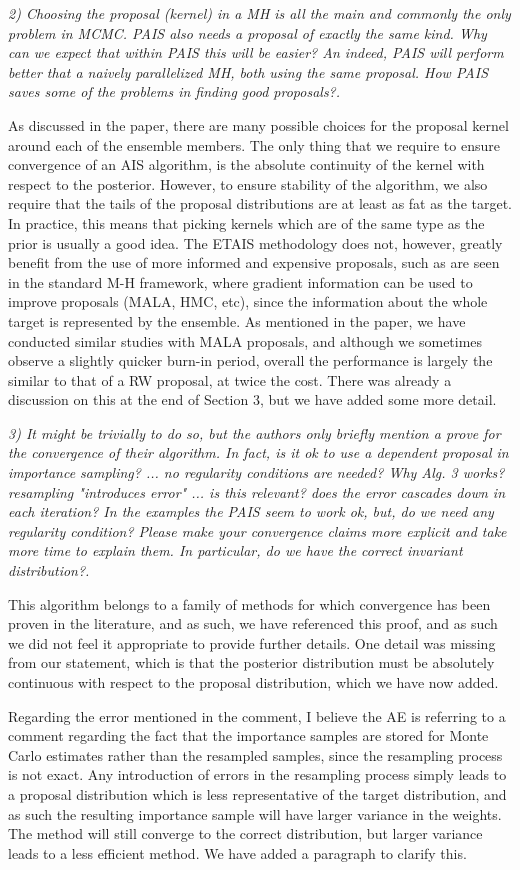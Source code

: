 \documentclass{article}
\newcommand{\comment}[2]{\vspace{0.6cm}{\bf Comment:} {\it #1.}

\vspace{0.3cm}{\bf Answer:} #2}
\begin{document}
\comment{2) Choosing the proposal (kernel) in a MH is all the main and commonly the only problem in MCMC. PAIS also needs a proposal of exactly the same kind. Why can we expect that within PAIS this will be easier? An indeed, PAIS will perform better that a naively parallelized MH, both using the same proposal. How PAIS saves some of the problems in finding good proposals?}{As discussed in the paper, there are many possible choices for the proposal kernel around each of the ensemble members. The only thing that we require to ensure convergence of an AIS algorithm, is the absolute continuity of the kernel with respect to the posterior. However, to ensure stability of the algorithm, we also require that the tails of the proposal distributions are at least as fat as the target. In practice, this means that picking kernels which are of the same type as the prior is usually a good idea. The ETAIS methodology does not, however, greatly benefit from the use of more informed and expensive proposals, such as are seen in the standard M-H framework, where gradient information can be used to improve proposals (MALA, HMC, etc), since the information about the whole target is represented by the ensemble. As mentioned in the paper, we have conducted similar studies with MALA proposals, and although we sometimes observe a slightly quicker burn-in period, overall the performance is largely the similar to that of a RW proposal, at twice the cost. There was already a discussion on this at the end of Section 3, but we have added some more detail.}

\comment{3) It might be trivially to do so, but the authors only briefly mention a prove for the convergence of their algorithm. In fact, is it ok to use a dependent proposal in importance sampling? ... no regularity conditions are needed? Why Alg. 3 works? resampling "introduces error" ... is this relevant? does the error cascades down in each iteration? In the examples the PAIS seem to work ok, but, do we need any regularity condition? Please make your convergence claims more explicit and take more time to explain them. In particular, do we have the correct invariant distribution?}{This algorithm belongs to a family of methods for which convergence has been proven in the literature, and as such, we have referenced this proof, and as such we did not feel it appropriate to provide further details. One detail was missing from our statement, which is that the posterior distribution must be absolutely continuous with respect to the proposal distribution, which we have now added.

Regarding the error mentioned in the comment, I believe the AE is referring to a comment regarding the fact that the importance samples are stored for Monte Carlo estimates rather than the resampled samples, since the resampling process is not exact. Any introduction of errors in the resampling process simply leads to a proposal distribution which is less representative of the target distribution, and as such the resulting importance sample will have larger variance in the weights. The method will still converge to the correct distribution, but larger variance leads to a less efficient method. We have added a paragraph to clarify this.}
\end{document}
